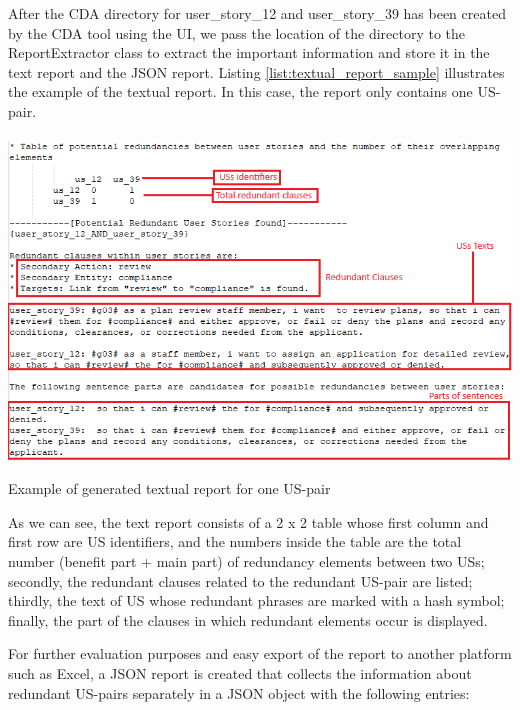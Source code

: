 \begin{example}
	After the CDA directory for user\_story\_12 and user\_story\_39 has been created by the CDA tool using the UI, we pass the location of the directory to the ReportExtractor class to extract the important information and store it in the text report and the JSON report.
	Listing \ref{list:textual_report_sample} illustrates the example of the textual report. In this case, the report only contains one US-pair.
	\begin{MyListing}
		\paragraph{}
		\centering
		\includegraphics[scale=0.7]{Listing/TextualReportSample.png}
		\caption{Example of generated textual report for one US-pair}\label{list:textual_report_sample}
	\end{MyListing}	
	As we can see, the text report consists of a 2 x 2 table whose first column and first row are US identifiers, and the numbers inside the table are the total number (benefit part + main part) of redundancy elements between two USs; secondly, the redundant clauses related to the redundant US-pair are listed; thirdly, the text of US whose redundant phrases are marked with a hash symbol; finally, the part of the clauses in which redundant elements occur is displayed.	
\end{example}
For further evaluation purposes and easy export of the report to another platform such as Excel, a JSON report is created that collects the information about redundant US-pairs separately in a JSON object with the following entries:
